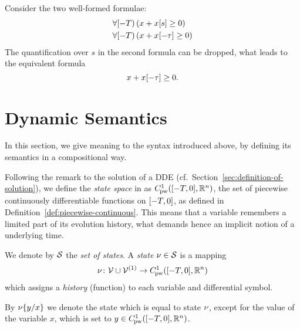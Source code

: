     \begin{example}
        Consider the two well-formed \ddL formulae:
        \begin{align*}
            &\hs{(x+\x[s]\geq 0)}\\
            &\hs{(x+\x[-\tau]\geq 0)} 
        \end{align*}
        The quantification over $s$ in the second formula can be dropped, what leads to the equivalent formula
        \begin{equation*}
            x+\x[-\tau]\geq 0.
        \end{equation*}
    \end{example}


\section{Dynamic Semantics}
    \label{sec:dynamic-semantics}


    In this section, we give meaning to the syntax introduced above, by defining its semantics in a compositional way.

    Following the remark to the solution of a DDE (cf.\ Section~\ref{sec:definition-of-solution}), we define the \emph{state space} in \ddL as $\statespace$, the set of piecewise continuously differentiable functions on $\closeddelayinterval$, as defined in Definition~\ref{def:piecewise-continuous}.
    This means that a variable remembers a limited part of its evolution history, what demands hence an implicit notion of a underlying time.

    We denote by $\states$ the \emph{set of states}. A \emph{state} $\asstate\in\states$ is a mapping
    \begin{equation}
        \asstate \from \allvars\cup\diffvars \to \statespace
    \end{equation}
    which assigns a \emph{history} (function) to each variable and differential symbol.

    By $\modif{\asstate}{x}{y}$ we denote the state which is equal to state $\asstate$, except for the value of the variable $x$, which is set to $y\in\statespace$.


    

